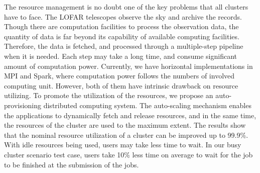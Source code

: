 


\begin{abstracts}        %

The resource management is no doubt one of the key problems that all clusters have to face. 
The LOFAR telescopes observe the sky and archive the records. 
Though there are computation facilities to process the observation data, the quantity of data is far beyond its capability of available computing facilities. 
Therefore, the data is fetched, and processed through a multiple-step pipeline when it is needed. 
Each step may take a long time, and consume significant amount of computation power. 
Currently, we have horizontal implementations in MPI and Spark,  where computation power follows the numbers of involved computing unit.
However, both of them have intrinsic drawback on resource utilizing. 
To promote the utilization of the resources, we propose an auto-provisioning distributed computing system. 
The auto-scaling mechanism enables the applications to dynamically fetch and release resources, and in the same time,  the resources of the cluster are used to the maximum extent. 
The results show that the nominal resource utilization of a cluster can be improved up to 99.9\%. 
With idle resources being used, users may take less time to wait. 
In our busy cluster scenario test case, users take 10\% less time on average to wait for the job to be finished at the submission of the jobs.


\end{abstracts}


